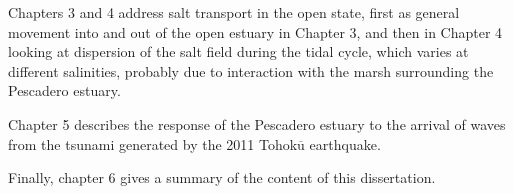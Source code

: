 Chapters 3 and 4 address salt transport in the open state, first as general movement into and out of the open estuary in Chapter 3, and then in Chapter 4 looking at dispersion of the salt field during the tidal cycle, which varies at different salinities, probably due to interaction with the marsh surrounding the Pescadero estuary.

Chapter 5 describes the response of the Pescadero estuary to the arrival of waves from the tsunami generated by the 2011 Tohok$\overline{\mathrm{u}}$ earthquake. 

Finally, chapter 6 gives a summary of the content of this dissertation.







